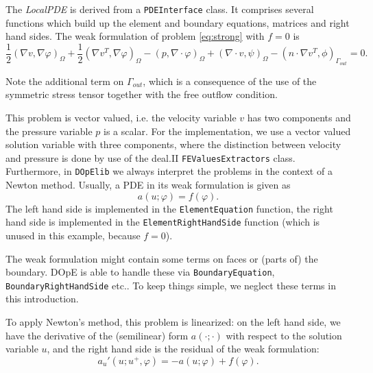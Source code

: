 \vspace{0.2cm}

The \textit{LocalPDE} is derived from a \texttt{PDEInterface} class. It comprises several functions which build up the element and boundary equations, matrices and right hand sides. The weak formulation of problem \eqref{eq:strong} with $f=0$ is
\begin{equation} \label{eq:weak}
   \frac{1}{2}(\nabla v, \nabla \varphi)_\Omega + \frac{1}{2}(\nabla v^{T}, \nabla \varphi)_\Omega - (p, \nabla \cdot \varphi)_\Omega + (\nabla \cdot v, \psi)_\Omega - (n\cdot \nabla v^T,\phi)_{\Gamma_{out}} = 0.
\end{equation}
\begin{remark}
Note the additional term on $\Gamma_{out}$, which is a consequence of the use of the symmetric stress tensor together with the free outflow condition.
\end{remark}
This problem is vector valued, i.e. the velocity variable $v$ has two components and the pressure variable $p$ is a scalar. For the implementation, we use a vector valued solution variable with three components, where the distinction between velocity and pressure is done by use of the deal.II \texttt{FEValuesExtractors} class. \\
Furthermore, in \texttt{DOpElib} we always interpret the problems in the context of a Newton method. Usually, a PDE in its weak formulation is given as
\begin{equation*}
   a(u;\varphi) = f(\varphi).
\end{equation*}
The left hand side is implemented in the \texttt{ElementEquation} function, the right hand side is implemented in the \texttt{ElementRightHandSide} function (which is unused in this example, because $f=0$).
\begin{remark}
The weak formulation might contain some terms on faces or (parts of) the boundary. DOpE is able to handle these via \texttt{BoundaryEquation}, \texttt{BoundaryRightHandSide} etc.. To keep things simple, we neglect these terms in this introduction.
\end{remark}
To apply Newton's method, this problem is linearized: on the left hand side, we have the derivative of the (semilinear) form $a(\cdot;\cdot)$ with respect to the solution variable $u$, and the right hand side is the residual of the weak formulation:
\begin{equation*}
   a_u'(u;u^+,\varphi) = -a(u;\varphi) + f(\varphi).
\end{equation*}
